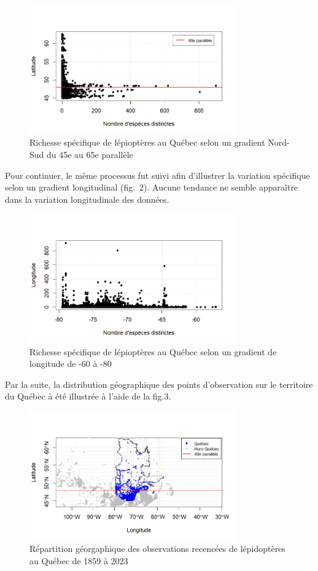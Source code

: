 \documentclass[conference,final,]{IEEEtran}
\begin{document}
\begin{figure}[H]
  \centering
  \includegraphics[width=3.5in]{lat.png}
  \caption{Richesse spécifique de lépioptères au Québec selon un gradient Nord-Sud du 45e au 65e parallèle}
\end{figure}

Pour continuer, le même processus fut suivi afin d'illustrer la
variation spécifique selon un gradient longitudinal (fig.~2). Aucune
tendance ne semble apparaître dans la variation longitudinale des
données.

\begin{figure}[H]
  \centering
  \includegraphics[width=3.5in]{lon.png}
  \caption{Richesse spécifique de lépioptères au Québec selon un gradient de longitude de -60 à -80}
\end{figure}

Par la suite, la distribution géographique des points d'observation sur
le territoire du Québec à été illustrée à l'aide de la fig.3.

\begin{figure}[H]
  \centering
  \includegraphics[width=3.5in]{quebec.png}
  \caption{Répartition géorgaphique des observations recencées de lépidoptères au Québec de 1859 à 2023}
\end{figure}
\end{document}
